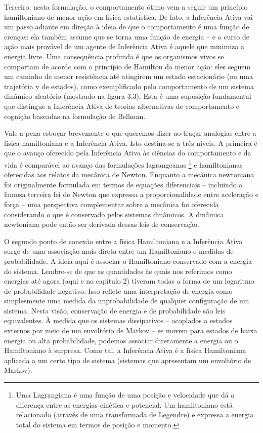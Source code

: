 \documentclass[
  12pt,
]{book}
\begin{document}
Terceiro, nesta formulação, o comportamento ótimo vem a seguir um princípio hamiltoniano de menor ação em física estatística. De fato, a Inferência Ativa vai um passo adiante em direção à ideia de que o comportamento é uma função de crenças: ela também assume que se torna uma função de energia -- e o curso de ação mais provável de um agente de Inferência Ativa é aquele que minimiza a energia livre. Uma consequência profunda é que os organismos vivos se comportam de acordo com o princípio de Hamilton da menor ação: eles seguem um caminho de menor resistência até atingirem um estado estacionário (ou uma trajetória y de estados), como exemplificado pelo comportamento de um sistema dinâmico aleatório (mostrado na figura 3.3). Esta é uma suposição fundamental que distingue a Inferência Ativa de teorias alternativas de comportamento e cognição baseadas na formulação de Bellman.

Vale a pena esboçar brevemente o que queremos dizer ao traçar analogias entre a física hamiltoniana e a Inferência Ativa. Isto destina-se a três níveis. A primeira é que o avanço oferecido pela Inferência Ativa às ciências do comportamento e da vida é comparável ao avanço das formulações lagrangeanas \footnote{Uma Lagrangiana é uma função de uma posição e velocidade que dá a diferença entre as energias cinética e potencial. Um hamiltoniano está relacionado (através de uma transformada de Legendre) e expressa a energia total do sistema em termos de posição e momento.} e hamiltonianas oferecidas aos relatos da mecânica de Newton. Enquanto a mecânica newtoniana foi originalmente formulada em termos de equações diferenciais -- incluindo a famosa terceira lei de Newton que expressa a proporcionalidade entre aceleração e força -- uma perspectiva complementar sobre a mecânica foi oferecida considerando o que é conservado pelos sistemas dinâmicos. A dinâmica newtoniana pode então ser derivada dessas leis de conservação.

O segundo ponto de conexão entre a física Hamiltoniana e a Inferência Ativa surge de uma associação mais direta entre um Hamiltoniano e medidas de probabilidade. A ideia aqui é associar o Hamiltoniano conservado com a energia do sistema. Lembre-se de que as quantidades às quais nos referimos como energias até agora (aqui e no capítulo 2) tiveram todas a forma de um logaritmo de probabilidade negativo. Isso reflete uma interpretação de energia como simplesmente uma medida da improbabilidade de qualquer configuração de um sistema. Nesta visão, conservação de energia e de probabilidade são leis equivalentes. À medida que os sistemas dissipativos -- acoplados a estados externos por meio de um envoltório de Markov -- se movem para estados de baixa energia ou alta probabilidade, podemos associar diretamente a energia ou o Hamiltoniano à surpresa. Como tal, a Inferência Ativa é a física Hamiltoniana aplicada a um certo tipo de sistema (sistemas que apresentam um envoltório de Markov).
\end{document}
